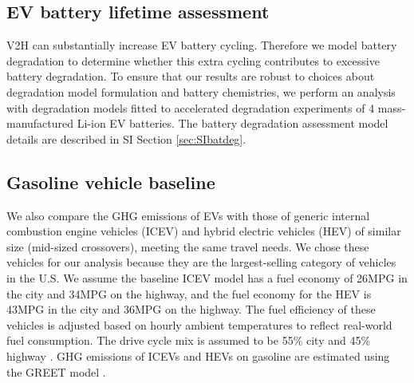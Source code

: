 \documentclass[11pt,preprint]{elsarticle}
\begin{document}
\subsection{EV battery lifetime assessment}

V2H can substantially increase EV battery cycling. Therefore we model battery degradation to determine whether this extra cycling contributes to excessive battery degradation. To ensure that our results are robust to choices about degradation model formulation and battery chemistries, we perform an analysis with degradation models fitted to accelerated degradation experiments of 4 mass-manufactured Li-ion EV batteries. The battery degradation assessment model details are described in SI Section \ref{sec:SIbatdeg}. 

\subsection{Gasoline vehicle baseline}

We also compare the GHG emissions of EVs with those of generic internal combustion engine vehicles (ICEV) and hybrid electric vehicles (HEV) of similar size (mid-sized crossovers), meeting the same travel needs. We chose these vehicles for our analysis because they are the largest-selling category of vehicles in the U.S. We assume the baseline ICEV model has a fuel economy of 26MPG in the city and 34MPG on the highway, and the fuel economy for the HEV is 43MPG in the city and 36MPG on the highway. The fuel efficiency of these vehicles is adjusted based on hourly ambient temperatures to reflect real-world fuel consumption. The drive cycle mix is assumed to be 55\% city and 45\% highway \cite{wu_regional_2019}. GHG emissions of ICEVs and HEVs on gasoline are estimated using the GREET model \cite{wang_greenhouse_2023}.
\end{document}
